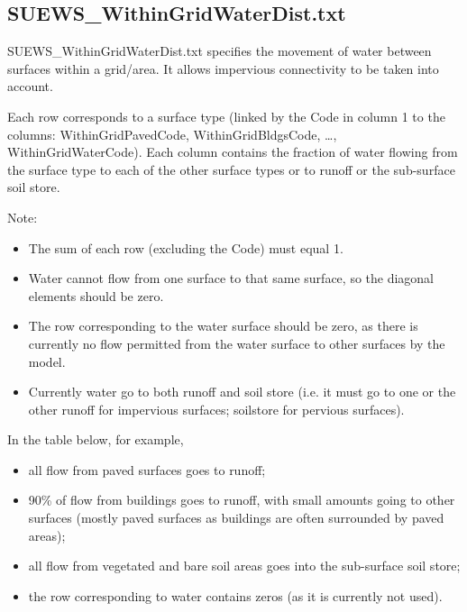 \documentclass[letterpaper,10pt,english]{sphinxmanual}
\begin{document}
\subsection{SUEWS\_WithinGridWaterDist.txt}
\label{\detokenize{input_files/SUEWS_SiteInfo/SUEWS_WithinGridWaterDist:suews-withingridwaterdist-txt}}\label{\detokenize{input_files/SUEWS_SiteInfo/SUEWS_WithinGridWaterDist::doc}}\label{\detokenize{input_files/SUEWS_SiteInfo/SUEWS_WithinGridWaterDist:id1}}
SUEWS\_WithinGridWaterDist.txt specifies the movement of water between
surfaces within a grid/area. It allows impervious connectivity to be
taken into account.

Each row corresponds to a surface type (linked by the Code in column 1
to the {\hyperref[\detokenize{input_files/SUEWS_SiteInfo/SUEWS_SiteSelect:suews-siteselect-txt}]{}} columns:
WithinGridPavedCode, WithinGridBldgsCode, …, WithinGridWaterCode). Each
column contains the fraction of water flowing from the surface type to
each of the other surface types or to runoff or the sub-surface soil
store.

Note:
\begin{itemize}
\item {} 
The sum of each row (excluding the Code) must equal 1.

\item {} 
Water cannot flow from one surface to that same surface, so the
diagonal elements should be zero.

\item {} 
The row corresponding to the water surface should be zero, as there
is currently no flow permitted from the water surface to other
surfaces by the model.

\item {} 
Currently water  go to both runoff and soil store (i.e. it
must go to one or the other \textendash{} runoff for impervious surfaces;
soilstore for pervious surfaces).

\end{itemize}

In the table below, for example,
\begin{itemize}
\item {} 
all flow from paved surfaces goes to runoff;

\item {} 
90\% of flow from buildings goes to runoff, with small amounts going
to other surfaces (mostly paved surfaces as buildings are often
surrounded by paved areas);

\item {} 
all flow from vegetated and bare soil areas goes into the sub-surface
soil store;

\item {} 
the row corresponding to water contains zeros (as it is currently not
used).

\end{itemize}
\end{document}
